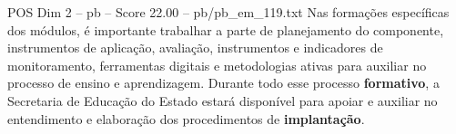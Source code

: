 \begin{textsample}{POS Dim 2 – pb – Score 22.00 – pb/pb\_em\_119.txt}
Nas formações específicas dos módulos, é importante trabalhar a parte de planejamento do componente, instrumentos de aplicação, avaliação, instrumentos e indicadores de monitoramento, ferramentas digitais e metodologias ativas para auxiliar no processo de ensino e aprendizagem.
Durante todo esse processo \textbf{formativo}, a Secretaria de Educação do Estado estará disponível para apoiar e auxiliar no entendimento e elaboração dos procedimentos de \textbf{implantação}.

\end{textsample}
